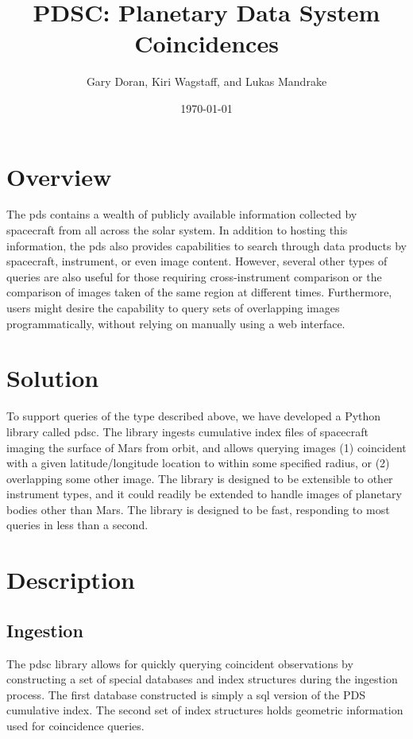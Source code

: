 \documentclass[twocolumn]{extarticle}
\title{
  PDSC: Planetary Data System Coincidences
}
\author{Gary Doran, Kiri Wagstaff, and Lukas Mandrake}
\date{\today}
\begin{document}
\maketitle

\section*{Overview}
The \ac{pds} contains a wealth of publicly available information collected by
spacecraft from all across the solar system. In addition to hosting this
information, the \ac{pds} also provides capabilities to search through data
products by spacecraft, instrument, or even image content. However, several
other types of queries are also useful for those requiring cross-instrument
comparison or the comparison of images taken of the same region at different
times. Furthermore, users might desire the capability to query sets of
overlapping images programmatically, without relying on manually using a web
interface.

\section*{Solution}
To support queries of the type described above, we have developed a Python
library called \ac{pdsc}. The library ingests cumulative index files of
spacecraft imaging the surface of Mars from orbit, and allows querying images
(1) coincident with a given latitude/longitude location to within some
specified radius, or (2) overlapping some other image. The library is designed
to be extensible to other instrument types, and it could readily be extended to
handle images of planetary bodies other than Mars. The library is designed to
be fast, responding to most queries in less than a second.

\section*{Description}

\subsection*{Ingestion}
The \ac{pdsc} library allows for quickly querying coincident observations by
constructing a set of special databases and index structures during the
ingestion process. The first database constructed is simply a \ac{sql} version
of the PDS cumulative index. The second set of index structures holds geometric
information used for coincidence queries.
\end{document}
